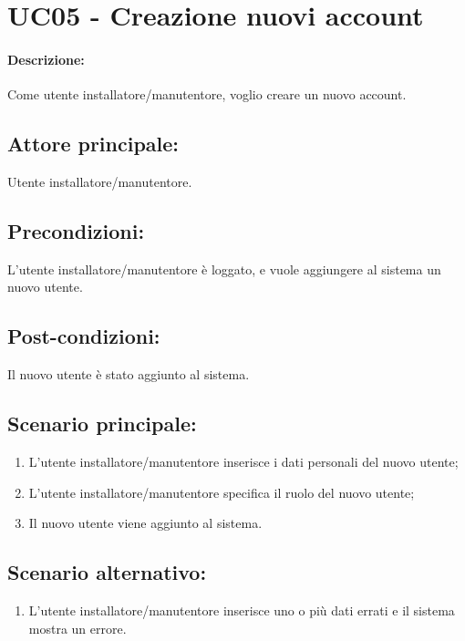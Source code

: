 \section{UC05 - Creazione nuovi account}

\paragraph{Descrizione:}
Come utente installatore/manutentore, voglio creare un nuovo account.

\subsection{Attore principale:}
Utente installatore/manutentore.

\subsection{Precondizioni:}
L'utente installatore/manutentore è loggato, e vuole aggiungere al sistema un nuovo utente.

\subsection{Post-condizioni:}
Il nuovo utente è stato aggiunto al sistema.

\subsection{Scenario principale:}
\begin{enumerate}
    \item L'utente installatore/manutentore inserisce i dati personali del nuovo utente; %
    \item L'utente installatore/manutentore specifica il ruolo del nuovo utente;
    \item Il nuovo utente viene aggiunto al sistema.
\end{enumerate}

\subsection{Scenario alternativo:}
\begin{enumerate}
    \item L'utente installatore/manutentore inserisce uno o più dati errati e il sistema mostra un errore.
\end{enumerate}
